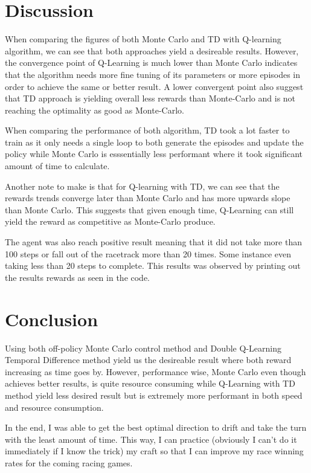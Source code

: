 \documentclass{article}
\begin{document}
\section{Discussion}
When comparing the figures of both Monte Carlo and TD with Q-learning algorithm,
we can see that both approaches yield a desireable results. However, the
convergence point of Q-Learning is much lower than Monte Carlo indicates that
the algorithm needs more fine tuning of its parameters or more episodes in order
to achieve the same or better result. A lower convergent point also suggest that
TD approach is yielding overall less rewards than Monte-Carlo and is not
reaching the optimality as good as Monte-Carlo.

When comparing the performance of both algorithm, TD took a lot faster to train
as it only needs a single loop to both generate the episodes and update the
policy while Monte Carlo is esssentially less performant where it took
significant amount of time to calculate.

Another note to make is that for Q-learning with TD, we can see that the rewards
trends converge later than Monte Carlo and has more upwards slope than Monte
Carlo. This suggests that given enough time, Q-Learning can still yield the
reward as competitive as Monte-Carlo produce.

The agent was also reach positive result meaning that it did
not take more than 100 steps or fall out of the racetrack more than 20 times.
Some instance even taking less than 20 steps to complete. This results was
observed by printing out the results rewards as seen in the code.

\section{Conclusion}
Using both off-policy Monte Carlo control method and Double Q-Learning Temporal
Difference method yield us the desireable result where both reward increasing
as time goes by. However, performance wise, Monte Carlo even though achieves
better results, is quite resource consuming while Q-Learning with TD method
yield less desired result but is extremely more performant in both speed and
resource consumption.

In the end, I was able to get the best optimal direction to drift and take the
turn with the least amount of time. This way, I can practice (obviously
I can't do it immediately if I know the trick) my craft so that I can improve my race
winning rates for the coming racing games.
\end{document}
